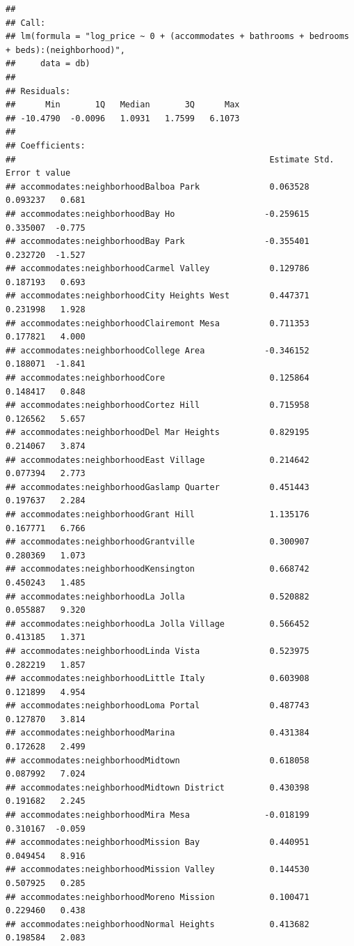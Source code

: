 \documentclass[
]{book}
\begin{document}
\begin{verbatim}
## 
## Call:
## lm(formula = "log_price ~ 0 + (accommodates + bathrooms + bedrooms + beds):(neighborhood)", 
##     data = db)
## 
## Residuals:
##      Min       1Q   Median       3Q      Max 
## -10.4790  -0.0096   1.0931   1.7599   6.1073 
## 
## Coefficients:
##                                                   Estimate Std. Error t value
## accommodates:neighborhoodBalboa Park              0.063528   0.093237   0.681
## accommodates:neighborhoodBay Ho                  -0.259615   0.335007  -0.775
## accommodates:neighborhoodBay Park                -0.355401   0.232720  -1.527
## accommodates:neighborhoodCarmel Valley            0.129786   0.187193   0.693
## accommodates:neighborhoodCity Heights West        0.447371   0.231998   1.928
## accommodates:neighborhoodClairemont Mesa          0.711353   0.177821   4.000
## accommodates:neighborhoodCollege Area            -0.346152   0.188071  -1.841
## accommodates:neighborhoodCore                     0.125864   0.148417   0.848
## accommodates:neighborhoodCortez Hill              0.715958   0.126562   5.657
## accommodates:neighborhoodDel Mar Heights          0.829195   0.214067   3.874
## accommodates:neighborhoodEast Village             0.214642   0.077394   2.773
## accommodates:neighborhoodGaslamp Quarter          0.451443   0.197637   2.284
## accommodates:neighborhoodGrant Hill               1.135176   0.167771   6.766
## accommodates:neighborhoodGrantville               0.300907   0.280369   1.073
## accommodates:neighborhoodKensington               0.668742   0.450243   1.485
## accommodates:neighborhoodLa Jolla                 0.520882   0.055887   9.320
## accommodates:neighborhoodLa Jolla Village         0.566452   0.413185   1.371
## accommodates:neighborhoodLinda Vista              0.523975   0.282219   1.857
## accommodates:neighborhoodLittle Italy             0.603908   0.121899   4.954
## accommodates:neighborhoodLoma Portal              0.487743   0.127870   3.814
## accommodates:neighborhoodMarina                   0.431384   0.172628   2.499
## accommodates:neighborhoodMidtown                  0.618058   0.087992   7.024
## accommodates:neighborhoodMidtown District         0.430398   0.191682   2.245
## accommodates:neighborhoodMira Mesa               -0.018199   0.310167  -0.059
## accommodates:neighborhoodMission Bay              0.440951   0.049454   8.916
## accommodates:neighborhoodMission Valley           0.144530   0.507925   0.285
## accommodates:neighborhoodMoreno Mission           0.100471   0.229460   0.438
## accommodates:neighborhoodNormal Heights           0.413682   0.198584   2.083

\end{verbatim}
\end{document}
